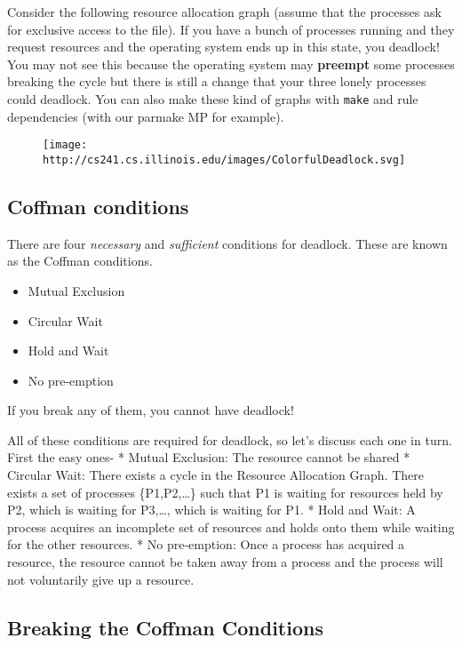 Consider the following resource allocation graph (assume that the
processes ask for exclusive access to the file). If you have a bunch of
processes running and they request resources and the operating system
ends up in this state, you deadlock! You may not see this because the
operating system may \textbf{preempt} some processes breaking the cycle
but there is still a change that your three lonely processes could
deadlock. You can also make these kind of graphs with \texttt{make} and
rule dependencies (with our parmake MP for example).

\begin{figure}[htbp]
\centering
\texttt{[image: http://cs241.cs.illinois.edu/images/ColorfulDeadlock.svg]}
\caption{}
\end{figure}

\subsection{Coffman conditions}\label{coffman-conditions}

There are four \emph{necessary} and \emph{sufficient} conditions for
deadlock. These are known as the Coffman conditions.

\begin{itemize}
\tightlist
\item
  Mutual Exclusion
\item
  Circular Wait
\item
  Hold and Wait
\item
  No pre-emption
\end{itemize}

If you break any of them, you cannot have deadlock!

All of these conditions are required for deadlock, so let's discuss each
one in turn. First the easy ones- * Mutual Exclusion: The resource
cannot be shared * Circular Wait: There exists a cycle in the Resource
Allocation Graph. There exists a set of processes \{P1,P2,\ldots{}\}
such that P1 is waiting for resources held by P2, which is waiting for
P3,\ldots{}, which is waiting for P1. * Hold and Wait: A process
acquires an incomplete set of resources and holds onto them while
waiting for the other resources. * No pre-emption: Once a process has
acquired a resource, the resource cannot be taken away from a process
and the process will not voluntarily give up a resource.

\subsection{Breaking the Coffman
Conditions}\label{breaking-the-coffman-conditions}

